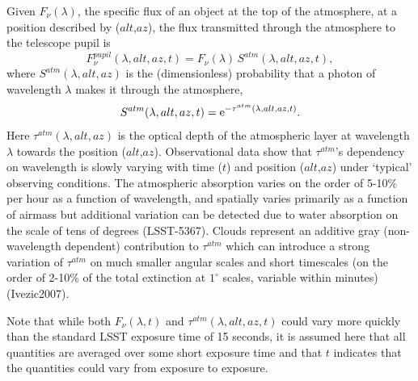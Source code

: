 \documentclass[12pt,preprint]{aastex}
\begin{document}
Given $F_\nu(\lambda)$, the specific flux of an object at
the top of the atmosphere, at a position described by ($alt$,$az$),
the flux transmitted through the atmosphere to the telescope pupil is
\begin{equation}
\label{eqn:Fpupil}
   F_\nu^{pupil}(\lambda,alt,az,t) = F_\nu(\lambda) \, S^{atm}(\lambda,alt,az,t),
\end{equation}
where $S^{atm}(\lambda,alt,az)$ is the (dimensionless) probability that a photon of 
wavelength $\lambda$ makes it through the atmosphere,
\begin{equation}
\label{eqn:atmTau}
   S^{atm}(\lambda,alt,az,t)   = {\rm e}^{-\tau^{atm}(\lambda,alt,az,t)}.
\end{equation}
Here $\tau^{atm}(\lambda,alt,az)$ is the optical depth of the
atmospheric layer at wavelength $\lambda$ towards the position
($alt$,$az$).  Observational data show that $\tau^{atm}$'s dependency
on wavelength is slowly varying with time ($t$) and position
($alt$,$az$) under `typical' observing conditions. The atmospheric
absorption varies on the order of 5-10\% per hour as a function of
wavelength, and spatially varies primarily as a function of airmass
but additional variation can be detected due to water absorption on
the scale of tens of degrees (LSST-5367).  Clouds represent an
additive gray (non-wavelength dependent) contribution to $\tau^{atm}$
which can introduce a strong variation of $\tau^{atm}$ on much smaller
angular scales and short timescales (on the order of 2-10\% of the
total extinction at $1^{\circ}$ scales, variable within minutes)
(Ivezic2007).

Note that while both $F_\nu(\lambda,t)$ and $\tau^{atm}(\lambda,alt,az,t)$ 
could vary more quickly than the standard LSST exposure time of 15
seconds, it is assumed here that all quantities are averaged over some
short exposure time and that $t$ indicates that the quantities could
vary from exposure to exposure. 
\end{document}
